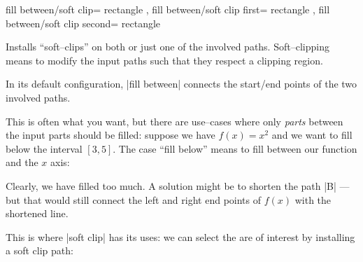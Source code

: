 \begin{pgfplotskeylist}{%
	fill between/soft clip= rectangle ,
	fill between/soft clip first= rectangle ,
	fill between/soft clip second= rectangle }
	
	Installs ``soft--clips'' on both or just one of the involved paths. Soft--clipping means to modify the input paths such that they respect a clipping region.

	In its default configuration, |fill between| connects the start/end points of the two involved paths.

	This is often what you want, but there are use--cases where only \emph{parts} between the input parts should be filled: suppose we have $f(x)=x^2$ and we want to fill below the interval $[3,5]$. The case ``fill below'' means to fill between our function and the $x$ axis:

\begin{codeexample}[]
\end{codeexample}
	\noindent Clearly, we have filled too much. A solution might be to shorten the path |B| --- but that would still connect the left and right end points of $f(x)$ with the shortened line.

	This is where |soft clip| has its uses: we can select the are of interest by installing a soft clip path:
\begin{codeexample}[]
\end{codeexample}
	

\end{pgfplotskeylist}
